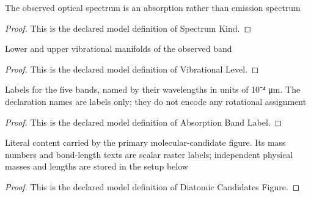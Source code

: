 \begin{definition}
  \label{def:physics:phyx-mini-0631:phyxminiproblems-problemphyxmini0631-spectrumkind}
  The observed optical spectrum is an absorption rather than emission spectrum
\end{definition}
\begin{proof}
  This is the declared model definition of Spectrum Kind.
\end{proof}
\begin{definition}
  \label{def:physics:phyx-mini-0631:phyxminiproblems-problemphyxmini0631-vibrationallevel}
  Lower and upper vibrational manifolds of the observed band
\end{definition}
\begin{proof}
  This is the declared model definition of Vibrational Level.
\end{proof}
\begin{definition}
  \label{def:physics:phyx-mini-0631:phyxminiproblems-problemphyxmini0631-absorptionbandlabel}
  Labels for the five bands, named by their wavelengths in units of 10⁻⁴ μm. The declaration names are labels only; they do not encode any rotational assignment
\end{definition}
\begin{proof}
  This is the declared model definition of Absorption Band Label.
\end{proof}
\begin{definition}
  \label{def:physics:phyx-mini-0631:phyxminiproblems-problemphyxmini0631-diatomiccandidatesfigure}
  Literal content carried by the primary molecular-candidate figure. Its mass numbers and bond-length texts are scalar raster labels; independent physical masses and lengths are stored in the setup below
\end{definition}
\begin{proof}
  This is the declared model definition of Diatomic Candidates Figure.
\end{proof}
